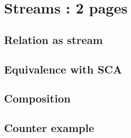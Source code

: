 \section{Streams : 2 pages}
\subsection*{Relation as stream}
\subsection*{Equivalence with SCA}
\subsection*{Composition}
\subsection*{Counter example}
